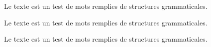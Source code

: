 \documentclass[a4paper,12pt]{report}
\begin{document}
\begin{center}
Le texte est un test de mots remplies
de structures grammaticales.
\end{center}

\begin{flushright}
Le texte est un test de mots remplies
de structures grammaticales.
\end{flushright}

\begin{flushleft}
Le texte est un test de mots remplies
de structures grammaticales.
\end{flushleft}
\end{document}
